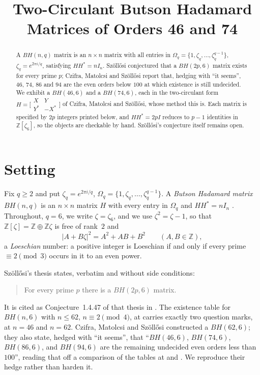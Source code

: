 \documentclass[11pt]{amsart}
\title[Two-circulant BH(46,6) and BH(74,6)]
{Two-Circulant Butson Hadamard Matrices of Orders 46 and 74}
\date{}
\theoremstyle{remark}
\newcommand{\zzz}{\zeta}
\newcommand{\Om}{\Omega}
\begin{document}
\begin{abstract}
A $BH(n,q)$ matrix is an $n\times n$ matrix with all entries in
$\Om_q=\{1,\zzz_q,\ldots,\zzz_q^{q-1}\}$, $\zzz_q=e^{2\pi i/q}$, satisfying
$HH^{*}=nI_n$. Szöll\H osi conjectured that a $BH(2p,6)$ matrix exists for
every prime $p$; Czifra, Matolcsi and Szöll\H osi report that, hedging with
``it seems'', $46$, $74$, $86$ and $94$ are the even orders below $100$ at
which existence is still undecided. We exhibit a $BH(46,6)$ and a $BH(74,6)$,
each in the two-circulant form
$H=\bigl[\begin{smallmatrix}X&Y\\Y^{*}&-X^{*}\end{smallmatrix}\bigr]$ of
Czifra, Matolcsi and Szöll\H osi, whose method this is. Each matrix is
specified by $2p$ integers printed below, and $HH^{*}=2pI$ reduces to
$p-1$ identities in $\mathbb Z[\zzz_6]$, so the objects are checkable by
hand. Szöll\H osi's conjecture itself remains open.
\end{abstract}

\maketitle

\section{Setting}

Fix $q\ge2$ and put $\zzz_q=e^{2\pi i/q}$,
$\Om_q=\{1,\zzz_q,\ldots,\zzz_q^{q-1}\}$. A \emph{Butson Hadamard matrix}
$BH(n,q)$ is an $n\times n$ matrix $H$ with every entry in $\Om_q$ and
$HH^{*}=nI_n$ \cite{Butson}. Throughout, $q=6$, we write $\zzz=\zzz_6$, and
we use $\zzz^2=\zzz-1$, so that $\mathbb Z[\zzz]=\mathbb Z\oplus\mathbb Z\zzz$
is free of rank~$2$ and
\begin{equation}\label{eq:norm}
 |A+B\zzz|^{2}=A^{2}+AB+B^{2}
 \qquad(A,B\in\mathbb Z),
\end{equation}
a \emph{Loeschian} number: a positive integer is Loeschian if and only if
every prime $\equiv2\pmod 3$ occurs in it to an even power.

Szöll\H osi's thesis \cite{Szollosi} states, verbatim and without side
conditions:
\begin{quote}
For every prime $p$ there is a $BH(2p,6)$ matrix.
\end{quote}
It is cited as Conjecture~1.4.47 of that thesis in \cite{CMS}. The existence
table for $BH(n,6)$ with $n\le62$, $n\equiv2\pmod4$, at
\cite[p.~32]{Szollosi} carries exactly two question marks, at $n=46$ and
$n=62$. Czifra, Matolcsi and Szöll\H osi \cite{CMS} constructed a $BH(62,6)$;
they also state, hedged with ``it seems'', that ``$BH(46,6)$, $BH(74,6)$,
$BH(86,6)$, and $BH(94,6)$ are the remaining undecided even orders less than
$100$'', reading that off a comparison of the tables at
\cite[p.~32]{Szollosi} and \cite[p.~111]{NP}. We reproduce their hedge
rather than harden it.
\end{document}

